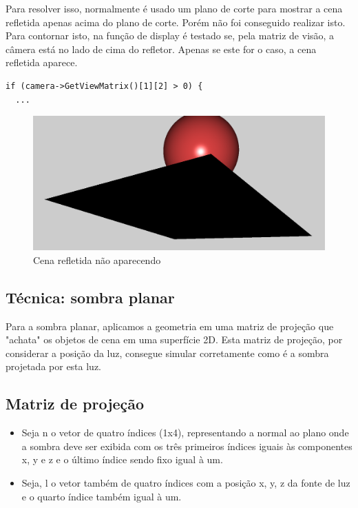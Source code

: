 \documentclass[11pt, a4paper]{article}
\begin{document}
Para resolver isso, normalmente é usado um plano de corte para mostrar a cena refletida apenas
acima do plano de corte. Porém não foi conseguido realizar isto. Para contornar isto, na função
de display é testado se, pela matriz de visão, a câmera está no lado de cima do
refletor.
Apenas se este for o caso, a cena refletida aparece.

\begin{verbatim}
if (camera->GetViewMatrix()[1][2] > 0) {
  ...
\end{verbatim}

\begin{figure}[H]
  \begin{center}
  \includegraphics[width=0.8\linewidth]{with-condition.png}
  \caption{Cena refletida não aparecendo}
  \label{fig:vaz}
  \end{center}
\end{figure}


\subsection {Técnica: sombra planar}

Para a sombra planar, aplicamos a geometria em uma matriz de projeção que "achata"
os objetos de cena em uma superfície 2D. Esta matriz de projeção, por considerar a posição da luz,
consegue simular corretamente como é a sombra projetada por esta luz.

\subsection{Matriz de projeção}

\begin{itemize}
\item Seja n o vetor de quatro índices (1x4), representando a normal ao plano onde a sombra deve
ser exibida com os três primeiros índices iguais às componentes x, y e z e o último
índice sendo fixo igual à um.

\item Seja, l o vetor também de quatro índices com a posição x, y, z da fonte de luz 
e o quarto índice também igual à um.

\end{itemize}
\end{document}
